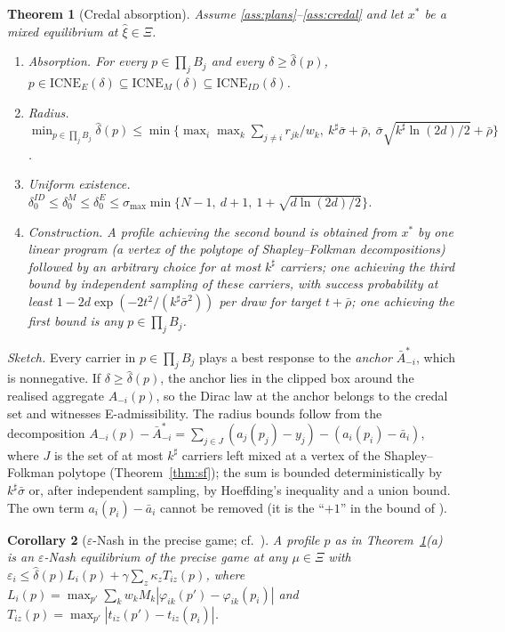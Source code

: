 \documentclass[preprint,12pt]{elsarticle}
\newtheorem{theorem}{Theorem}
\newtheorem{corollary}[theorem]{Corollary}
\theoremstyle{definition}
\theoremstyle{remark}
\newcommand{\abar}{\bar a}
\newcommand{\Abar}{\bar A}
\newcommand{\ICNE}{\mathrm{ICNE}}
\begin{document}
\begin{theorem}[Credal absorption]\label{thm:main}
Assume \ref{ass:plans}--\ref{ass:credal} and let $x^*$ be a mixed equilibrium at $\hat\xi\in\Xi$.
\begin{enumerate}[label=(\alph*),leftmargin=*]
\item \emph{Absorption.} For every $p\in\prod_jB_j$ and every $\delta\ge\hat\delta(p)$, $p\in\ICNE_E(\delta)\subseteq\ICNE_M(\delta)\subseteq\ICNE_{ID}(\delta)$.
\item \emph{Radius.} $\min_{p\in\prod_jB_j}\hat\delta(p)\le\min\big\{\max_i\max_k\sum_{j\ne i}r_{jk}/w_k,\ k^\sharp\bar\sigma+\bar\rho,\ \bar\sigma\sqrt{k^\sharp\ln(2d)/2}+\bar\rho\big\}$.
\item \emph{Uniform existence.} $\delta_0^{ID}\le\delta_0^M\le\delta_0^E\le\sigma_{\max}\min\{N-1,\ d+1,\ 1+\sqrt{d\ln(2d)/2}\}$.
\item \emph{Construction.} A profile achieving the second bound is obtained from $x^*$ by one linear program (a vertex of the polytope of Shapley--Folkman decompositions) followed by an arbitrary choice for at most $k^\sharp$ carriers; one achieving the third bound by independent sampling of these carriers, with success probability at least $1-2d\exp(-2t^2/(k^\sharp\bar\sigma^2))$ per draw for target $t+\bar\rho$; one achieving the first bound is any $p\in\prod_jB_j$.
\end{enumerate}
\end{theorem}

\emph{Sketch.} Every carrier in $p\in\prod_jB_j$ plays a best response to the \emph{anchor} $\Abar^*_{-i}$, which is nonnegative. If $\delta\ge\hat\delta(p)$, the anchor lies in the clipped box around the realised aggregate $A_{-i}(p)$, so the Dirac law at the anchor belongs to the credal set and witnesses E-admissibility. The radius bounds follow from the decomposition $A_{-i}(p)-\Abar^*_{-i}=\sum_{j\in J}(a_j(p_j)-y_j)-(a_i(p_i)-\abar_i)$, where $J$ is the set of at most $k^\sharp$ carriers left mixed at a vertex of the Shapley--Folkman polytope (Theorem~\ref{thm:sf}); the sum is bounded deterministically by $k^\sharp\bar\sigma$ or, after independent sampling, by Hoeffding's inequality \citep{Hoeffding1963} and a union bound. The own term $a_i(p_i)-\abar_i$ cannot be removed (it is the ``$+1$'' in the bound of \citealp{Liu2023}).

\begin{corollary}[$\varepsilon$-Nash in the precise game; cf.\ \citealp{Liu2023}]\label{cor:eps}
A profile $p$ as in Theorem~\ref{thm:main}(a) is an $\varepsilon$-Nash equilibrium of the precise game at any $\mu\in\Xi$ with $\varepsilon_i\le\hat\delta(p)L_i(p)+\gamma\sum_z\kappa_zT_{iz}(p)$, where $L_i(p)=\max_{p'}\sum_kw_kM_k|\varphi_{ik}(p')-\varphi_{ik}(p_i)|$ and $T_{iz}(p)=\max_{p'}|t_{iz}(p')-t_{iz}(p_i)|$.
\end{corollary}
\end{document}
